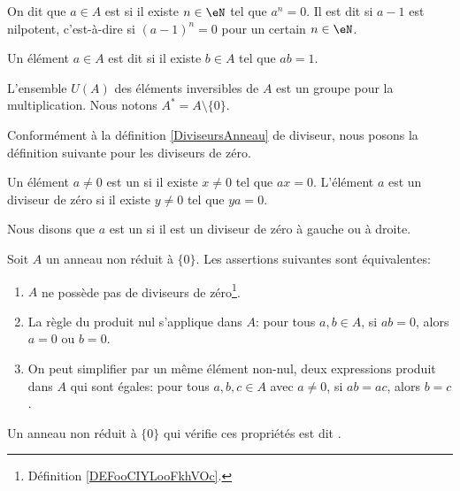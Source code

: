 \begin{definition}  \label{DEFooHRRYooTmbUTH}
	On dit que \( a \in A \) est  si il existe \( n \in \eN \) tel que \( a^n = 0 \). Il est dit  si \( a-1\) est nilpotent, c'est-à-dire si \( (a-1)^n =0\) pour un certain \( n \in \eN \).
\end{definition}

\begin{definition}        \label{DEFooCIHVooAhpJxy}
	Un élément \( a \in A \) est dit  si il existe \( b \in A \) tel que \( ab = 1 \).

	L'ensemble \( U(A)\) des éléments inversibles de \( A\) est un groupe pour la multiplication. Nous notons \( A^*=A\setminus\{ 0 \}\).
\end{definition}

Conformément à la définition \ref{DiviseursAnneau} de diviseur, nous posons la définition suivante pour les diviseurs de zéro.
\begin{definition}		\label{DEFooCIYLooFkhVOc}
	Un élément \( a\neq 0\) est un  si il existe \( x\neq 0\) tel que \( ax=0\). L'élément \( a\) est un diviseur de zéro  si il existe \( y\neq 0\) tel que \( ya=0\).

	Nous disons que \( a\) est un  si il est un diviseur de zéro à gauche ou à droite.
\end{definition}

\begin{propositionDef}           \label{DEFooTAOPooWDPYmd}
	Soit \( A\) un anneau non réduit à \( \{ 0 \}\). Les assertions suivantes sont équivalentes:
	\begin{enumerate}
		\item       \label{ITEMooMXMKooXMYpkN}
		      \( A\) ne possède pas de diviseurs de zéro\footnote{Définition \ref{DEFooCIYLooFkhVOc}.}.
		\item       \label{ITEMooLAJCooFwxXrV}
		      La règle du produit nul s'applique dans \( A\): pour tous \( a, b \in A \), si \( ab=0\), alors \( a = 0\) ou \( b = 0\).
		\item       \label{ITEMooQNTFooSRrVPK}
		      On peut simplifier par un même élément non-nul, deux expressions produit dans \( A\) qui sont égales: pour tous \( a, b, c \in A \) avec \( a \neq 0 \), si \( ab = ac \), alors \( b = c \).
	\end{enumerate}
	Un anneau non réduit à \( \{ 0 \}\) qui vérifie ces propriétés est dit .
\end{propositionDef}

